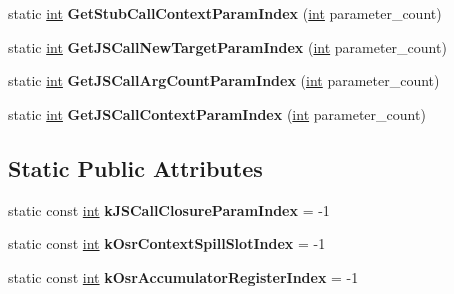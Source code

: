 \begin{DoxyCompactItemize}
static \mbox{\hyperlink{classint}{int}} {\bfseries Get\+Stub\+Call\+Context\+Param\+Index} (\mbox{\hyperlink{classint}{int}} parameter\+\_\+count)
\item 
\mbox{\label{classv8_1_1internal_1_1compiler_1_1Linkage_af762f3466c13483c3b6d62bcd5e9ac9f}} 
static \mbox{\hyperlink{classint}{int}} {\bfseries Get\+J\+S\+Call\+New\+Target\+Param\+Index} (\mbox{\hyperlink{classint}{int}} parameter\+\_\+count)
\item 
\mbox{\label{classv8_1_1internal_1_1compiler_1_1Linkage_a3915e2418081caad877584238ff3c923}} 
static \mbox{\hyperlink{classint}{int}} {\bfseries Get\+J\+S\+Call\+Arg\+Count\+Param\+Index} (\mbox{\hyperlink{classint}{int}} parameter\+\_\+count)
\item 
\mbox{\label{classv8_1_1internal_1_1compiler_1_1Linkage_a25735a05f61b95969cc11d53306f7329}} 
static \mbox{\hyperlink{classint}{int}} {\bfseries Get\+J\+S\+Call\+Context\+Param\+Index} (\mbox{\hyperlink{classint}{int}} parameter\+\_\+count)
\end{DoxyCompactItemize}
\subsection*{Static Public Attributes}
\begin{DoxyCompactItemize}
\item 
\mbox{\label{classv8_1_1internal_1_1compiler_1_1Linkage_a8baedbe94adccb7e24c2b1e568a0c6bc}} 
static const \mbox{\hyperlink{classint}{int}} {\bfseries k\+J\+S\+Call\+Closure\+Param\+Index} = -\/1
\item 
\mbox{\label{classv8_1_1internal_1_1compiler_1_1Linkage_aa7d05f42f4ed3adf29e52ab2b97944a8}} 
static const \mbox{\hyperlink{classint}{int}} {\bfseries k\+Osr\+Context\+Spill\+Slot\+Index} = -\/1
\item 
\mbox{\label{classv8_1_1internal_1_1compiler_1_1Linkage_ab32c5c593a35d36a6120cda70f5cb6ef}} 
static const \mbox{\hyperlink{classint}{int}} {\bfseries k\+Osr\+Accumulator\+Register\+Index} = -\/1
\end{DoxyCompactItemize}


